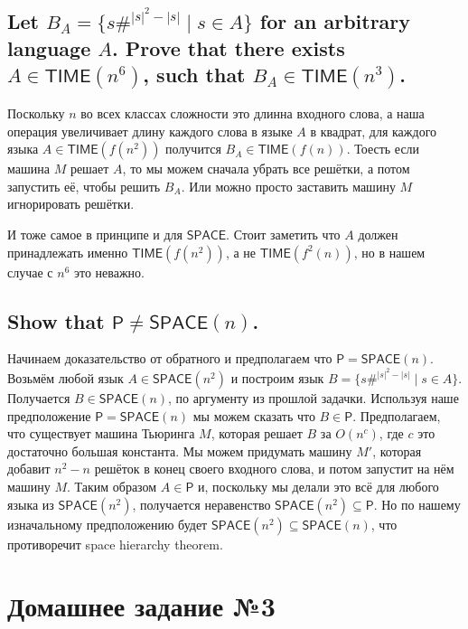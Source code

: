 \documentclass{article}
\begin{document}
  \subsection{Let $B_A = \{s\#^{|s|^2-|s|} \mid s \in A\}$ for an arbitrary language $A$. Prove that there exists $A \in \mathsf{TIME}(n^6)$, such that $B_A \in \mathsf{TIME}(n^3)$.}
  Поскольку $n$ во всех классах сложности это длинна входного слова, а наша операция увеличивает длину каждого слова в языке $A$ в квадрат, для каждого языка $A \in \mathsf{TIME}(f(n^2))$ получится $B_A \in \mathsf{TIME}(f(n))$.
  Тоесть если машина $M$ решает $A$, то мы можем сначала убрать все решётки, а потом запустить её, чтобы решить $B_A$.
  Или можно просто заставить машину $M$ игнорировать решётки.

  И тоже самое в принципе и для $\mathsf{SPACE}$.
  Стоит заметить что $A$ должен принадлежать именно $\mathsf{TIME}(f(n^2))$, а не $\mathsf{TIME}(f^2(n))$,
  но в нашем случае с $n^6$ это неважно.

  \subsection{Show that $\mathsf{P} \neq \mathsf{SPACE}(n)$.}
  Начинаем доказательство от обратного и предполагаем что $\mathsf{P} = \mathsf{SPACE}(n)$.
  Возьмём любой язык $A \in \mathsf{SPACE}(n^2)$ и построим язык $B = \{s\#^{|s|^2-|s|} \mid s \in A\}$.
  Получается $B \in \mathsf{SPACE}(n)$, по аргументу из прошлой задачки.
  Используя наше предположение $\mathsf{P} = \mathsf{SPACE}(n)$ мы можем сказать что $B \in \mathsf{P}$.
  Предполагаем, что существует машина Тьюринга $M$, которая решает $B$ за $O(n^c)$, где $c$ это достаточно большая константа.
  Мы можем придумать машину $M'$, которая добавит $n^2-n$ решёток в конец своего входного слова, и потом запустит на нём машину $M$.
  Таким образом $A \in \mathsf{P}$ и, поскольку мы делали это всё для любого языка из $\mathsf{SPACE}(n^2)$,
  получается неравенство $\mathsf{SPACE}(n^2) \subseteq \mathsf{P}$.
  Но по нашему изначальному предположению будет $\mathsf{SPACE}(n^2) \subseteq \mathsf{SPACE}(n)$,
  что противоречит space hierarchy theorem.

  \section{Домашнее задание №3}
  \setcounter{subsection}{5}
\end{document}
